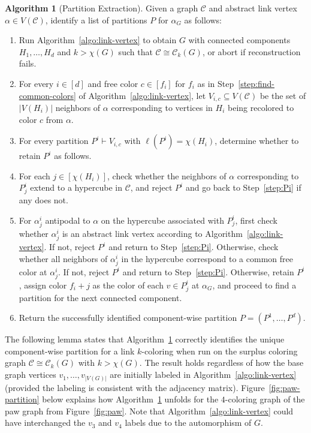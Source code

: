 \documentclass{amsart}
\theoremstyle{hypothesisstyle}
\theoremstyle{definition}
\newtheorem{algorithm}[alg]{Algorithm}
\theoremstyle{remark}
\numberwithin{equation}{section}
\newcommand{\abs}[1]{\lvert#1\rvert}
\newcommand{\C}{\mathcal C}
\begin{document}
\begin{algorithm}[Partition Extraction]\label{algo:partitions} 
    Given a graph $\C$ and abstract link vertex $\alpha\in V(\C)$, identify a list of partitions $P$ for $\alpha_G$ as follows:
\begin{enumerate}
\item\label{step:vertex-labels} Run Algorithm~\ref{algo:link-vertex} to obtain $G$ with connected components $H_1,\dots,H_d$ and $k>\chi(G)$ such that $\C\cong\C_k(G)$, or abort if reconstruction fails. 
 \item\label{step:cc-and-color} For every $i\in [d]$ and free color $c\in [f_i]$ for $f_i$ as in Step~\ref{step:find-common-colors} of Algorithm~\ref{algo:link-vertex}, let $V_{i,c}\subseteq V(\C)$ be the set of $\abs{V(H_i)}$ neighbors of $\alpha$ corresponding to vertices in $H_i$ being recolored to color $c$ from $\alpha$. 
 \item\label{step:Pi} For every partition $P^i \vdash V_{i,c}$ with $\ell(P^i)=\chi(H_i)$, determine whether to retain $P^i$ as follows. 
\item\label{step:extend-to-hypercube} For each $j\in[\chi(H_i)]$, check whether the neighbors of $\alpha$ corresponding to $P_j^i$  extend to a hypercube in $\C$, and reject $P^i$ and go back to Step~\ref{step:Pi} if any does not. 
\item\label{step:consistent-antipode} For $\alpha_j^i$ antipodal to $\alpha$ on the hypercube associated with $P^i_j$, first check whether $\alpha_j^i$ is an abstract link vertex according to Algorithm~\ref{algo:link-vertex}. If not, reject $P^i$ and return to Step~\ref{step:Pi}. Otherwise, check whether all neighbors of $\alpha_j^i$ in the hypercube correspond to a common free color at $\alpha_j^i$. If not, reject $P^i$ and return to Step~\ref{step:Pi}. Otherwise, retain $P^i$, assign color $f_i+j$ as the color of each $v\in P^i_j$ at $\alpha_G$, and proceed to find a partition for the next connected component. 
\item Return the successfully identified component-wise partition $P=(P^1,\dots,P^d)$.
\end{enumerate}
\end{algorithm}

The following lemma states that Algorithm~\ref{algo:partitions} correctly identifies the unique component-wise partition for a link $k$-coloring when run on the surplus coloring graph $\mathcal{C}\cong \mathcal{C}_{k}(G)$ with $k>\chi(G)$. The result holds regardless of how the base graph vertices $v_1, \dots, v_{\abs{V(G)}}$ are initially labeled in Algorithm~\ref{algo:link-vertex} (provided the labeling is consistent with the adjacency matrix). Figure~\ref{fig:paw-partition} below explains how Algorithm~\ref{algo:partitions} unfolds for the $4$-coloring graph of the paw graph from Figure~\ref{fig:paw}. Note that Algorithm~\ref{algo:link-vertex} could have interchanged the $v_3$ and $v_4$ labels due to the automorphism of $G$.
\end{document}
